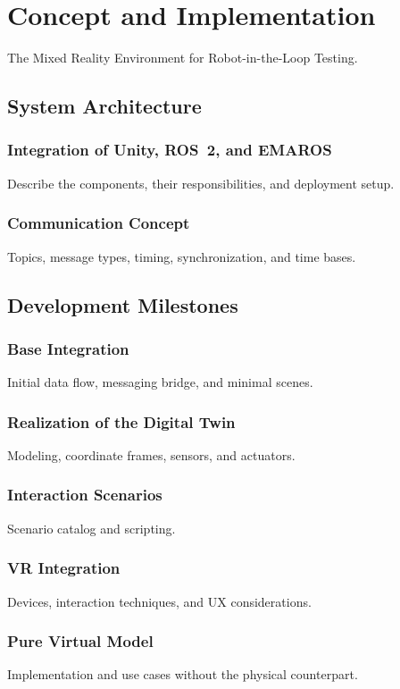 \chapter{Concept and Implementation} \label{chap:concept}

The Mixed Reality Environment for Robot-in-the-Loop Testing.

\section{System Architecture}
\subsection{Integration of Unity, ROS~2, and EMAROS}
Describe the components, their responsibilities, and deployment setup.

\subsection{Communication Concept}
Topics, message types, timing, synchronization, and time bases.

\section{Development Milestones}
\subsection{Base Integration}
Initial data flow, messaging bridge, and minimal scenes.

\subsection{Realization of the Digital Twin}
Modeling, coordinate frames, sensors, and actuators.

\subsection{Interaction Scenarios}
Scenario catalog and scripting.

\subsection{VR Integration}
Devices, interaction techniques, and UX considerations.

\subsection{Pure Virtual Model}
Implementation and use cases without the physical counterpart.
